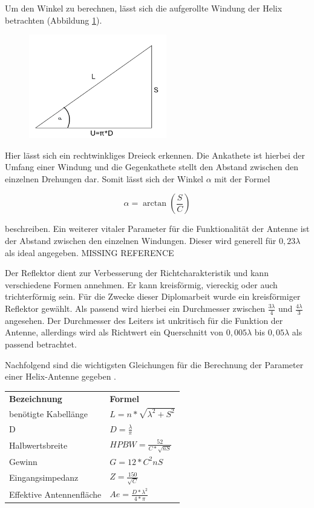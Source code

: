 Um den Winkel zu berechnen, lässt sich die aufgerollte Windung der Helix betrachten (Abbildung \ref{fig:Wndg_aufgerollt}).

\begin{figure}[H]
	\centering
	\includegraphics[width=6cm]{../ref/Windung_aufgerollt.png}
	\label{fig:Wndg_aufgerollt}
\end{figure}

Hier lässt sich ein rechtwinkliges Dreieck erkennen. Die Ankathete ist hierbei der Umfang einer Windung und die Gegenkathete stellt den Abstand zwischen den einzelnen Drehungen dar. Somit lässt sich der Winkel $\alpha$ mit der Formel

\begin{equation}
	\alpha=\arctan(\frac{S}{C})
\end{equation}

beschreiben. Ein weiterer vitaler Parameter für die Funktionalität der Antenne ist der Abstand zwischen den einzelnen Windungen. Dieser wird generell für $0,23\lambda$ als ideal angegeben. MISSING REFERENCE

Der Reflektor dient zur Verbesserung der Richtcharakteristik und kann verschiedene Formen annehmen. Er kann kreisförmig, viereckig oder auch trichterförmig sein. Für die Zwecke dieser Diplomarbeit wurde ein kreisförmiger Reflektor gewählt. Als passend wird hierbei ein Durchmesser zwischen $\frac{3\lambda}{4}$ und $\frac{4\lambda}{3}$ angesehen. Der Durchmesser des Leiters ist unkritisch für die Funktion der Antenne, allerdings wird als Richtwert ein Querschnitt von $0,005\lambda$ bis $0,05\lambda$ als passend betrachtet\cite{Kraus-2002-AntennasB}. 

Nachfolgend sind die wichtigsten Gleichungen für die Berechnung der Parameter einer Helix-Antenne gegeben \cite{Kraus-2002-AntennasB}.

\begin{table}[H]
	\begin{tabular}{l|l}

		\textbf{Bezeichnung} & \textbf{Formel}\\ 
		benötigte Kabellänge & $L=n*\sqrt{\lambda^2+S^2}$ \\
		D				     & $D=\frac{\lambda}{\pi}$\\ 
		Halbwertsbreite		 & $HPBW=\frac{52}{C*\sqrt{nS}}$ \\ 
		Gewinn               & $G=12*C^2nS$                 \\ 
		Eingangsimpedanz     & $Z=\frac{150}{\sqrt{C}}$      \\ 
		Effektive Antennenfläche    & $Ae=\frac{D*\lambda^2}{4*\pi}$ \\ 
		\end{tabular}
	\end{table}

